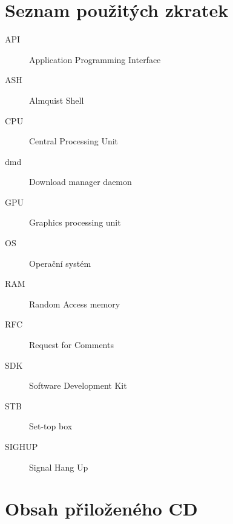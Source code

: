 \documentclass[thesis=B,czech]{FITthesis}[2012/06/26]
\begin{document}
\begin{conclusion}

\end{conclusion}




\appendix

\chapter{Seznam použitých zkratek}
\begin{description}
	\item[API] Application Programming Interface
	\item[ASH] Almquist Shell
	\item[CPU] Central Processing Unit
	\item[dmd] Download manager daemon
	\item[GPU] Graphics processing unit
	\item[OS] Operační systém
	\item[RAM] Random Access memory
	\item[RFC] Request for Comments
	\item[SDK] Software Development Kit
	\item[STB] Set-top box
	\item[SIGHUP] Signal Hang Up
\end{description}

\chapter{Obsah přiloženého CD}

\begin{figure}
\end{figure}
\end{document}
